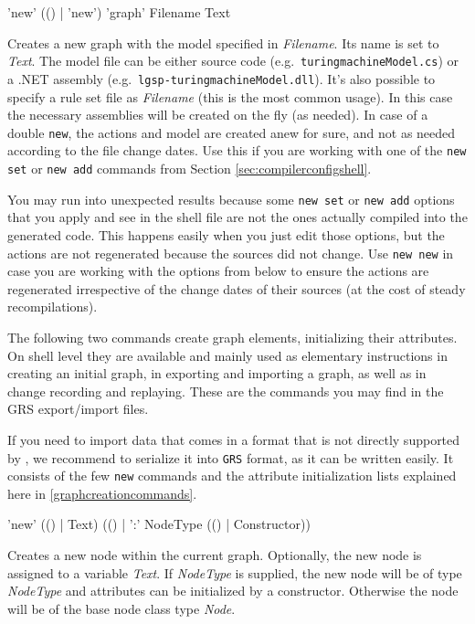\begin{rail}
  'new' (() | 'new') 'graph' Filename Text
\end{rail}
Creates a new graph with the model specified in \emph{Filename}.
Its name is set to \emph{Text}.
The model file can be either source code (e.g.\ \texttt{turing\textunderscore machineModel.cs}) or a .NET assembly (e.g.\ \texttt{lgsp-turing\textunderscore machineModel.dll}).
It's also possible to specify a rule set file as \emph{Filename} (this is the most common usage).
In this case the necessary assemblies will be created on the fly (as needed).
In case of a double \texttt{new}, the actions and model are created anew for sure, and not as needed according to the file change dates.
Use this if you are working with one of the \texttt{new set} or \texttt{new add} commands from Section \ref{sec:compilerconfigshell}.

\begin{warning}
You may run into unexpected results because some \texttt{new set} or \texttt{new add} options that you apply and see in the shell file are not the ones actually compiled into the generated code.
This happens easily when you just edit those options, but the actions are not regenerated because the sources did not change.
Use \texttt{new new} in case you are working with the options from below to ensure the actions are regenerated irrespective of the change dates of their sources (at the cost of steady recompilations).
\end{warning}

The following two commands create graph elements, initializing their attributes.
On shell level they are available and mainly used as elementary instructions in creating an initial graph, in exporting and importing a graph, as well as in change recording and replaying.
These are the commands you may find in the GRS export/import files.


\begin{note}
If you need to import data that comes in a format that is not directly supported by \GrG,
we recommend to serialize it into \texttt{GRS} format,
as it can be written easily.
It consists of the few \texttt{new} commands and the attribute initialization lists explained here in \ref{graphcreationcommands}.
\end{note}

\begin{rail}
  'new' (() | Text) (() | ':' NodeType (() | Constructor))
\end{rail}
Creates a new node within the current graph.
Optionally, the new node is assigned to a variable \emph{Text}.
If \emph{NodeType} is supplied, the new node will be of type \emph{NodeType} and attributes can be initialized by a constructor.
Otherwise the node will be of the base node class type \emph{Node}.

